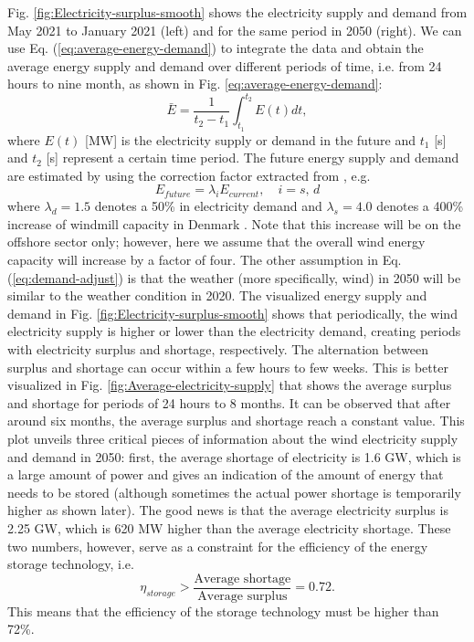 \documentclass{ECOS_2021}
\begin{document}
Fig. \ref{fig:Electricity-surplus-smooth} shows the electricity supply
and demand from May 2021 to January 2021 (left) and for the same period
in 2050 (right). We can use Eq. (\ref{eq:average-energy-demand})
to integrate the data and obtain the average energy supply and demand
over different periods of time, i.e. from 24 hours to nine month,
as shown in Fig. \ref{eq:average-energy-demand}:
\begin{equation}
\bar{E}=\frac{1}{t_{2}-t_{1}}\int_{t_{1}}^{t_{2}}E\left(t\right)dt,\label{eq:average-energy-demand}
\end{equation}
where $E(t)$ {[}MW{]} is the electricity supply or demand in the
future and $t_{1}$ {[}s{]} and $t_{2}$ {[}s{]} represent a certain
time period. The future energy supply and demand are estimated by
using the correction factor extracted from \cite{eftekhariQuantifyingRoleLiquid2020},
e.g.
\begin{equation}
E_{future}=\lambda_{i}E_{current},\quad i=s,\,d\label{eq:demand-adjust}
\end{equation}
where $\lambda_{d}=1.5$ denotes a 50\% in electricity demand \cite{eftekhariQuantifyingRoleLiquid2020}
and $\lambda_{s}=4.0$ denotes a 400\% increase of windmill capacity
in Denmark \cite{danishenergyagencyEnergyIslands2021,dandreaSynergiesOffshoreEnergy2021}.
Note that this increase will be on the offshore sector only; however,
here we assume that the overall wind energy capacity will increase
by a factor of four. The other assumption in Eq. (\ref{eq:demand-adjust})
is that the weather (more specifically, wind) in 2050 will be similar
to the weather condition in 2020. The visualized energy supply and
demand in Fig. \ref{fig:Electricity-surplus-smooth} shows that periodically,
the wind electricity supply is higher or lower than the electricity
demand, creating periods with electricity surplus and shortage, respectively.
The alternation between surplus and shortage can occur within a few
hours to few weeks. This is better visualized in Fig. \ref{fig:Average-electricity-supply}
that shows the average surplus and shortage for periods of 24 hours
to 8 months. It can be observed that after around six months, the
average surplus and shortage reach a constant value. This plot unveils
three critical pieces of information about the wind electricity supply
and demand in 2050: first, the average shortage of electricity is
1.6 GW, which is a large amount of power and gives an indication of
the amount of energy that needs to be stored (although sometimes the
actual power shortage is temporarily higher as shown later). The good
news is that the average electricity surplus is 2.25 GW, which is
620 MW higher than the average electricity shortage. These two numbers,
however, serve as a constraint for the efficiency of the energy storage
technology, i.e.
\[
\eta_{storage}>\frac{\text{Average shortage}}{\text{Average surplus}}=0.72.
\]
This means that the efficiency of the storage technology must be higher
than 72\%.
\end{document}
